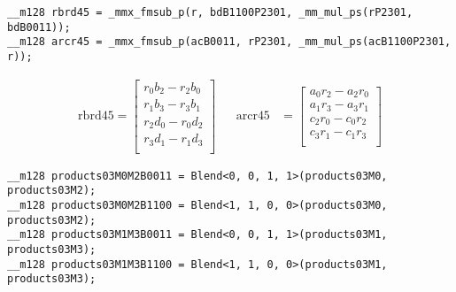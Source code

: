 \begin{verbatim}
__m128 rbrd45 = _mmx_fmsub_p(r, bdB1100P2301, _mm_mul_ps(rP2301, bdB0011));
__m128 arcr45 = _mmx_fmsub_p(acB0011, rP2301, _mm_mul_ps(acB1100P2301, r));
\end{verbatim}

\begin{align*}
\mathrm{rbrd45} 
=
\begin{bmatrix}
r_0b_2- r_2b_0\\
r_1b_3- r_3b_1\\
r_2d_0- r_0d_2\\
r_3d_1- r_1d_3\\
\end{bmatrix}
&&
\mathrm{arcr45} 
&=
\begin{bmatrix}
a_0r_2 - a_2r_0\\
a_1r_3 - a_3r_1\\
c_2r_0 - c_0r_2\\
c_3r_1 - c_1r_3\\
\end{bmatrix}
\end{align*}

\begin{verbatim}
__m128 products03M0M2B0011 = Blend<0, 0, 1, 1>(products03M0, products03M2);
__m128 products03M0M2B1100 = Blend<1, 1, 0, 0>(products03M0, products03M2);
__m128 products03M1M3B0011 = Blend<0, 0, 1, 1>(products03M1, products03M3);
__m128 products03M1M3B1100 = Blend<1, 1, 0, 0>(products03M1, products03M3);
\end{verbatim}

